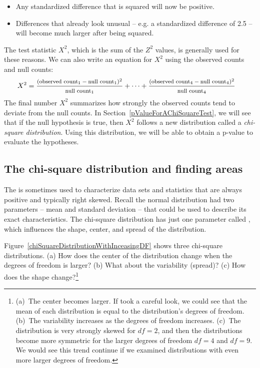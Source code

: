 \begin{itemize}
\setlength{\itemsep}{0mm}
\item Any standardized difference that is squared will now be positive.
\item Differences that already look unusual -- e.g. a standardized difference of 2.5 -- will become much larger after being squared.
\end{itemize}
The test statistic $X^2$, which is the sum of the $Z^2$ values, is generally used for these reasons. We can also write an equation for $X^2$ using the observed counts and null counts:
\begin{align*}
X^2 &=
	\frac
	{\text{\footnotesize$(\text{observed count}_1 - \text{null count}_1)^2$}}
	{\text{\footnotesize$\text{null count}_1$}}
	+ \dots + \frac
	{\text{\footnotesize$(\text{observed count}_4 - \text{null count}_4)^2$}}
	{\text{\footnotesize$\text{null count}_4$}}
\end{align*}
The final number $X^2$ summarizes how strongly the observed counts tend to deviate from the null counts. In Section~\ref{pValueForAChiSquareTest}, we will see that if the null hypothesis is true, then $X^2$ follows a new distribution called a \emph{chi-square distribution}. Using this distribution, we will be able to obtain a p-value to evaluate the hypotheses.


\subsection{The chi-square distribution and finding areas}

The  is sometimes used to characterize data sets and statistics that are always positive and typically right skewed. Recall the normal distribution had two parameters -- mean and standard deviation -- that could be used to describe its exact characteristics. The chi-square distribution has just one parameter called , which influences the shape, center, and spread of the distribution.

\begin{exercise}\label{exerChiSquareDistributionDescriptionWithMoreDOF}
Figure~\ref{chiSquareDistributionWithInceasingDF} shows three chi-square distributions. (a) How does the center of the distribution change when the degrees of freedom is larger? (b) What about the variability (spread)? (c) How does the shape change?\footnote{(a)~The center becomes larger. If took a careful look, we could see that the mean of each distribution is equal to the distribution's degrees of freedom. (b)~The variability increases as the degrees of freedom increases. (c)~The distribution is very strongly skewed for $df=2$, and then the distributions become more symmetric for the larger degrees of freedom $df=4$ and $df=9$. We would see this trend continue if we examined distributions with even more larger degrees of freedom.}
\end{exercise}

